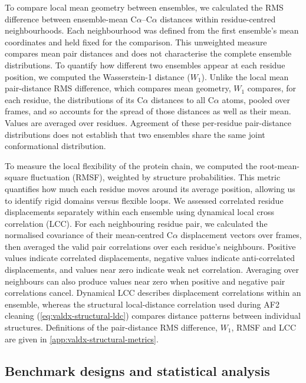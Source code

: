 To compare local mean geometry between ensembles, we calculated the RMS difference between ensemble-mean C$\alpha$--C$\alpha$ distances within residue-centred neighbourhoods. Each neighbourhood was defined from the first ensemble's mean coordinates and held fixed for the comparison. This unweighted measure compares mean pair distances and does not characterise the complete ensemble distributions. To quantify how different two ensembles appear at each residue position, we computed the Wasserstein-1 distance ($W_1$). Unlike the local mean pair-distance RMS difference, which compares mean geometry, $W_1$ compares, for each residue, the distributions of its C$\alpha$ distances to all C$\alpha$ atoms, pooled over frames, and so accounts for the spread of those distances as well as their mean. Values are averaged over residues. Agreement of these per-residue pair-distance distributions does not establish that two ensembles share the same joint conformational distribution.

To measure the local flexibility of the protein chain, we computed the root-mean-square fluctuation (RMSF), weighted by structure probabilities. This metric quantifies how much each residue moves around its average position, allowing us to identify rigid domains versus flexible loops. We assessed correlated residue displacements separately within each ensemble using dynamical local cross correlation (LCC). For each neighbouring residue pair, we calculated the normalised covariance of their mean-centred C$\alpha$ displacement vectors over frames, then averaged the valid pair correlations over each residue's neighbours. Positive values indicate correlated displacements, negative values indicate anti-correlated displacements, and values near zero indicate weak net correlation. Averaging over neighbours can also produce values near zero when positive and negative pair correlations cancel. Dynamical LCC describes displacement correlations within an ensemble, whereas the structural local-distance correlation used during AF2 cleaning (\cref{eq:valdx-structural-ldc}) compares distance patterns between individual structures. Definitions of the pair-distance RMS difference, $W_1$, RMSF and LCC are given in \cref{app:valdx-structural-metrics}.

\subsection{Benchmark designs and statistical analysis}
\label{sec:valdx-benchmarks}

